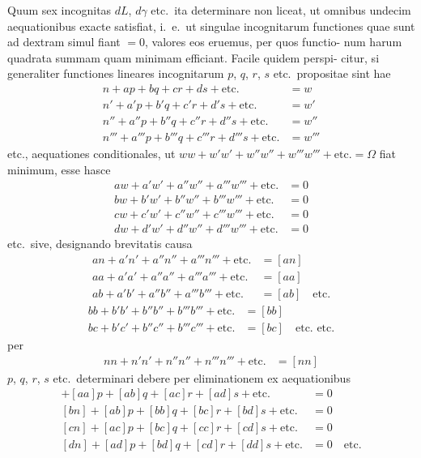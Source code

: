 \documentclass[12pt,a4paper]{article}
\begin{document}
Quum sex incognitas $dL$, $d\gamma$ etc.\ ita determinare non liceat, ut omnibus
undecim aequationibus exacte satisfiat, i.\ e.\ ut singulae incognitarum functiones
quae sunt ad dextram simul fiant $= 0$, valores eos eruemus, per quos functio-
num harum quadrata summam quam minimam efficiant. Facile quidem perspi-
citur, si generaliter functiones lineares incognitarum $p$, $q$, $r$, $s$ etc.\ propositae
sint hae
\begin{align*}
n + ap + bq + cr + ds + \text{etc.} &= w \\
n' + a'p + b'q + c'r + d's + \text{etc.} &= w' \\
n'' + a''p + b''q + c''r + d''s + \text{etc.} &= w'' \\
n''' + a'''p + b'''q + c'''r + d'''s + \text{etc.} &= w'''
\end{align*}
etc., aequationes conditionales, ut $ww + w'w' + w''w'' + w'''w''' + \text{etc.} = \Omega$ fiat
minimum, esse hasce
\begin{align*}
aw + a'w' + a''w'' + a'''w''' + \text{etc.} &= 0 \\
bw + b'w' + b''w'' + b'''w''' + \text{etc.} &= 0 \\
cw + c'w' + c''w'' + c'''w''' + \text{etc.} &= 0 \\
dw + d'w' + d''w'' + d'''w''' + \text{etc.} &= 0
\end{align*}
etc.\ sive, designando brevitatis causa
\begin{align*}
an + a'n' + a''n'' + a'''n''' + \text{etc.} &= [an] \\
aa + a'a' + a''a'' + a'''a''' + \text{etc.} &= [aa] \\
ab + a'b' + a''b'' + a'''b''' + \text{etc.} &= [ab] \quad \text{etc.}
\end{align*}
\begin{align*}
bb + b'b' + b''b'' + b'''b''' + \text{etc.} &= [bb] \\
bc + b'c' + b''c'' + b'''c''' + \text{etc.} &= [bc] \quad \text{etc. etc.}
\end{align*}
per
\begin{align*}
nn + n'n' + n''n'' + n'''n''' + \text{etc.} &= [nn]
\end{align*}
$p$, $q$, $r$, $s$ etc.\ determinari debere per eliminationem ex aequationibus
\begin{align*}
[an] + [aa]p + [ab]q + [ac]r + [ad]s + \text{etc.} &= 0 \\
[bn] + [ab]p + [bb]q + [bc]r + [bd]s + \text{etc.} &= 0 \\
[cn] + [ac]p + [bc]q + [cc]r + [cd]s + \text{etc.} &= 0 \\
[dn] + [ad]p + [bd]q + [cd]r + [dd]s + \text{etc.} &= 0 \quad \text{etc.}
\end{align*}
\end{document}
